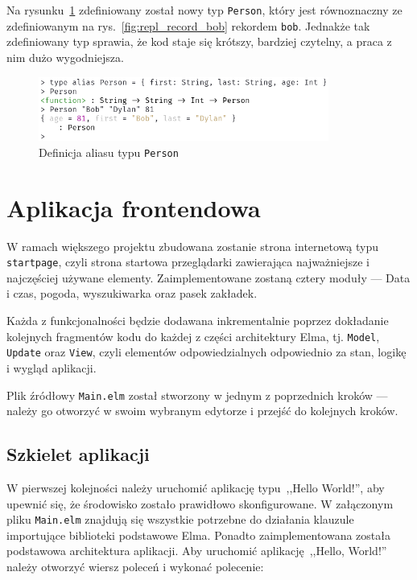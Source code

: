 \documentclass[twoside,a4paper]{report}
\begin{document}
Na rysunku~\ref{lab:repl_type_alias} zdefiniowany został nowy typ \texttt{Person}, który jest równoznaczny ze zdefiniowanym na rys.~\ref{fig:repl_record_bob} rekordem \texttt{bob}.
Jednakże tak zdefiniowany typ sprawia, że kod staje się krótszy, bardziej czytelny, a praca z nim dużo wygodniejsza.
\begin{figure}[H]
    \centering
    \includegraphics[width=0.85\textwidth]{img/repl_type_alias}
    \caption{Definicja aliasu typu \texttt{Person}}\label{lab:repl_type_alias}
\end{figure}

\section*{Aplikacja frontendowa}
W ramach większego projektu zbudowana zostanie strona internetową typu \texttt{startpage}, czyli strona startowa przeglądarki zawierająca najważniejsze i najczęściej używane elementy.
Zaimplementowane zostaną cztery moduły --- Data i czas, pogoda, wyszukiwarka oraz pasek zakładek.

Każda z funkcjonalności będzie dodawana inkrementalnie poprzez dokładanie kolejnych fragmentów kodu do każdej z części architektury Elma, tj. \texttt{Model}, \texttt{Update} oraz \texttt{View}, czyli elementów odpowiedzialnych odpowiednio za stan, logikę i wygląd aplikacji.

Plik źródłowy \texttt{Main.elm} został stworzony w jednym z poprzednich kroków --- należy go otworzyć w swoim wybranym edytorze i przejść do kolejnych kroków.

\subsection*{Szkielet aplikacji}
W pierwszej kolejności należy uruchomić aplikację typu~,,Hello World!'', aby upewnić się, że środowisko zostało prawidłowo skonfigurowane.
W załączonym pliku \texttt{Main.elm} znajdują się wszystkie potrzebne do działania klauzule importujące biblioteki podstawowe Elma.
Ponadto zaimplementowana została podstawowa architektura aplikacji.
Aby uruchomić aplikację~,,Hello, World!'' należy otworzyć wiersz poleceń i wykonać polecenie:
\end{document}
